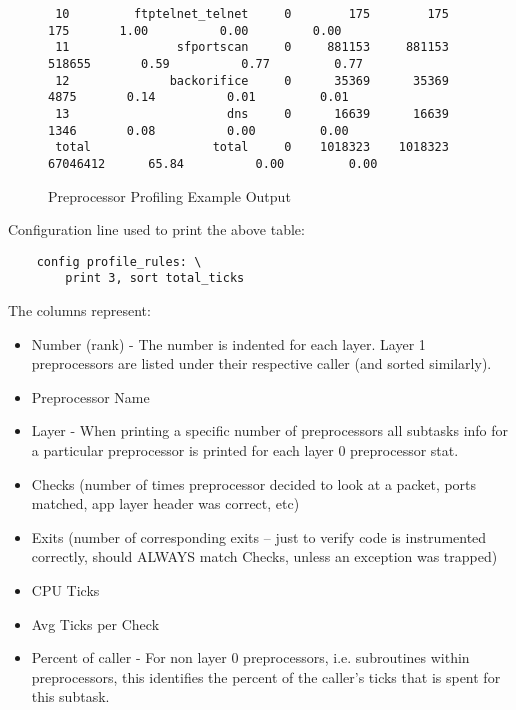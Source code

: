 \documentclass[english]{report}
\begin{document}
\begin{figure}
{\begin{verbatim}
 10         ftptelnet_telnet     0        175        175                 175       1.00          0.00         0.00
 11               sfportscan     0     881153     881153              518655       0.59          0.77         0.77
 12              backorifice     0      35369      35369                4875       0.14          0.01         0.01
 13                      dns     0      16639      16639                1346       0.08          0.00         0.00
 total                 total     0    1018323    1018323            67046412      65.84          0.00         0.00
\end{verbatim}
}
\caption{Preprocessor Profiling Example Output}
\label{preprocessor profiling example output}
\end{figure}

Configuration line used to print the above table: 

\begin{verbatim}
    config profile_rules: \
        print 3, sort total_ticks
\end{verbatim}

The columns represent:

\begin{itemize}

\item Number (rank) - The number is indented for each layer.  Layer 1
preprocessors are listed under their respective caller (and sorted similarly).

\item Preprocessor Name

\item Layer - When printing a specific number of preprocessors all subtasks
info for a particular preprocessor is printed for each layer 0 preprocessor
stat.

\item Checks (number of times preprocessor decided to look at a packet, ports
matched, app layer header was correct, etc)

\item Exits  (number of corresponding exits -- just to verify code is
instrumented correctly, should ALWAYS match Checks, unless an exception was
trapped)

\item CPU Ticks

\item Avg Ticks per Check

\item Percent of caller - For non layer 0 preprocessors, i.e. subroutines
within preprocessors, this identifies the percent of the caller's ticks that is
spent for this subtask.

\end{itemize}
\end{document}
